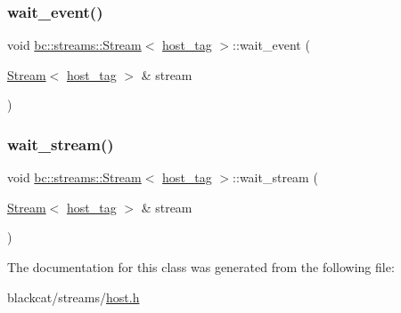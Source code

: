 \subsubsection{\texorpdfstring{wait\+\_\+event()}{wait\_event()}}
{\footnotesize\ttfamily void \hyperlink{classbc_1_1streams_1_1Stream}{bc\+::streams\+::\+Stream}$<$ \hyperlink{structbc_1_1host__tag}{host\+\_\+tag} $>$\+::wait\+\_\+event (\begin{DoxyParamCaption}\item[{\hyperlink{classbc_1_1streams_1_1Stream}{Stream}$<$ \hyperlink{structbc_1_1host__tag}{host\+\_\+tag} $>$ \&}]{stream }\end{DoxyParamCaption})\hspace{0.3cm}{\ttfamily [inline]}}

\mbox{\label{classbc_1_1streams_1_1Stream_3_01host__tag_01_4_a4fad8fd543a537f0990407c5e46ba5e2}} 
\subsubsection{\texorpdfstring{wait\+\_\+stream()}{wait\_stream()}}
{\footnotesize\ttfamily void \hyperlink{classbc_1_1streams_1_1Stream}{bc\+::streams\+::\+Stream}$<$ \hyperlink{structbc_1_1host__tag}{host\+\_\+tag} $>$\+::wait\+\_\+stream (\begin{DoxyParamCaption}\item[{\hyperlink{classbc_1_1streams_1_1Stream}{Stream}$<$ \hyperlink{structbc_1_1host__tag}{host\+\_\+tag} $>$ \&}]{stream }\end{DoxyParamCaption})\hspace{0.3cm}{\ttfamily [inline]}}



The documentation for this class was generated from the following file\+:\begin{DoxyCompactItemize}
\item 
blackcat/streams/\hyperlink{streams_2host_8h}{host.\+h}\end{DoxyCompactItemize}
